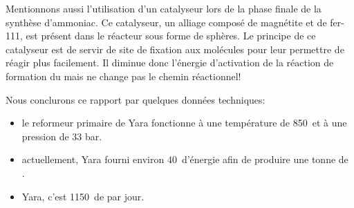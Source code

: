 \documentclass[a4paper,12pt, oneside]{article}
\begin{document}
	Mentionnons aussi l'utilisation d'un catalyseur lors de la phase finale de la synthèse d'ammoniac. Ce catalyseur, un alliage composé de magnétite et de fer-111, est présent dans le réacteur sous forme de sphères. Le principe de ce catalyseur est de servir de site de fixation aux molécules pour leur permettre de réagir plus facilement. Il diminue donc l'énergie d'activation de la réaction de formation du  mais ne change pas le chemin réactionnel!
	
	Nous conclurons ce rapport par quelques données techniques:
	\begin{itemize}
	\item le reformeur primaire de Yara fonctionne à une température de 850\celsius \ et à une pression de 33 bar.
	\item actuellement, Yara fourni environ 40\giga\joule \ d'énergie afin de produire une tonne de .
	\item Yara, c'est 1150\tonne \ de  par jour. 
	\end{itemize}
		
		
\end{document}
